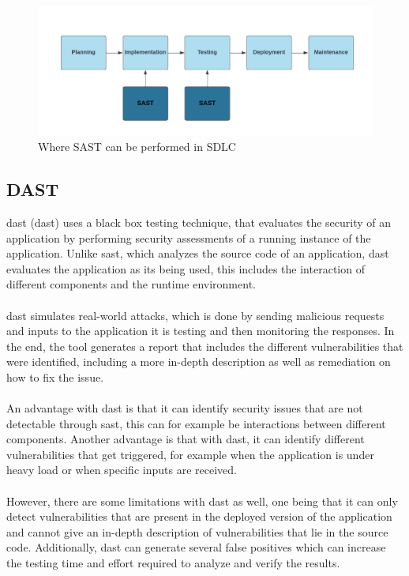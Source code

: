\vspace{2mm}
\begin{figure}[H]
    \centering
    \includegraphics[width=0.8\columnwidth]{Images/sast.png}
    \caption{Where SAST can be performed in SDLC}
    \label{fig: Performance of SAST in SDLC}
\end{figure}


\subsection{DAST}
\acrlong{dast} (\acrshort{dast}) uses a black box testing technique, that evaluates the security of an application by performing security assessments of a running instance of the application. Unlike \acrshort{sast}, which analyzes the source code of an application, \acrshort{dast} evaluates the application as its being used, this includes the interaction of different components and the runtime environment. 
\\~\\
\acrshort{dast} simulates real-world attacks, which is done by sending malicious requests and inputs to the application it is testing and then monitoring the responses. In the end, the tool generates a report that includes the different vulnerabilities that were identified, including a more in-depth description as well as remediation on how to fix the issue. 
\\~\\
An advantage with \acrshort{dast} is that it can identify security issues that are not detectable through \acrshort{sast}, this can for example be interactions between different components. Another advantage is that with \acrshort{dast}, it can identify different vulnerabilities that get triggered, for example when the application is under heavy load or when specific inputs are received.
\\~\\
However, there are some limitations with \acrshort{dast} as well, one being that it can only detect vulnerabilities that are present in the deployed version of the application and cannot give an in-depth description of vulnerabilities that lie in the source code. Additionally, \acrshort{dast} can generate several false positives which can increase the testing time and effort required to analyze and verify the results. 
